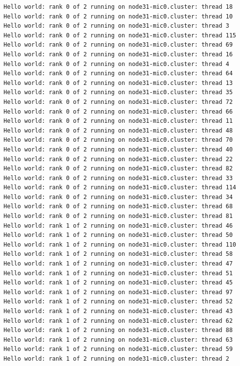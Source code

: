 \documentclass[pscyr,10pt]{hedlab}
\begin{document}
\begin{lstlisting}
  Hello world: rank 0 of 2 running on node31-mic0.cluster: thread 18
  Hello world: rank 0 of 2 running on node31-mic0.cluster: thread 10
  Hello world: rank 0 of 2 running on node31-mic0.cluster: thread 3
  Hello world: rank 0 of 2 running on node31-mic0.cluster: thread 115
  Hello world: rank 0 of 2 running on node31-mic0.cluster: thread 69
  Hello world: rank 0 of 2 running on node31-mic0.cluster: thread 16
  Hello world: rank 0 of 2 running on node31-mic0.cluster: thread 4
  Hello world: rank 0 of 2 running on node31-mic0.cluster: thread 64
  Hello world: rank 0 of 2 running on node31-mic0.cluster: thread 13
  Hello world: rank 0 of 2 running on node31-mic0.cluster: thread 35
  Hello world: rank 0 of 2 running on node31-mic0.cluster: thread 72
  Hello world: rank 0 of 2 running on node31-mic0.cluster: thread 66
  Hello world: rank 0 of 2 running on node31-mic0.cluster: thread 11
  Hello world: rank 0 of 2 running on node31-mic0.cluster: thread 48
  Hello world: rank 0 of 2 running on node31-mic0.cluster: thread 70
  Hello world: rank 0 of 2 running on node31-mic0.cluster: thread 40
  Hello world: rank 0 of 2 running on node31-mic0.cluster: thread 22
  Hello world: rank 0 of 2 running on node31-mic0.cluster: thread 82
  Hello world: rank 0 of 2 running on node31-mic0.cluster: thread 33
  Hello world: rank 0 of 2 running on node31-mic0.cluster: thread 114
  Hello world: rank 0 of 2 running on node31-mic0.cluster: thread 34
  Hello world: rank 0 of 2 running on node31-mic0.cluster: thread 68
  Hello world: rank 0 of 2 running on node31-mic0.cluster: thread 81
  Hello world: rank 1 of 2 running on node31-mic0.cluster: thread 46
  Hello world: rank 1 of 2 running on node31-mic0.cluster: thread 50
  Hello world: rank 1 of 2 running on node31-mic0.cluster: thread 110
  Hello world: rank 1 of 2 running on node31-mic0.cluster: thread 58
  Hello world: rank 1 of 2 running on node31-mic0.cluster: thread 47
  Hello world: rank 1 of 2 running on node31-mic0.cluster: thread 51
  Hello world: rank 1 of 2 running on node31-mic0.cluster: thread 45
  Hello world: rank 1 of 2 running on node31-mic0.cluster: thread 97
  Hello world: rank 1 of 2 running on node31-mic0.cluster: thread 52
  Hello world: rank 1 of 2 running on node31-mic0.cluster: thread 43
  Hello world: rank 1 of 2 running on node31-mic0.cluster: thread 62
  Hello world: rank 1 of 2 running on node31-mic0.cluster: thread 88
  Hello world: rank 1 of 2 running on node31-mic0.cluster: thread 63
  Hello world: rank 1 of 2 running on node31-mic0.cluster: thread 59
  Hello world: rank 1 of 2 running on node31-mic0.cluster: thread 2

\end{lstlisting}
\end{document}
